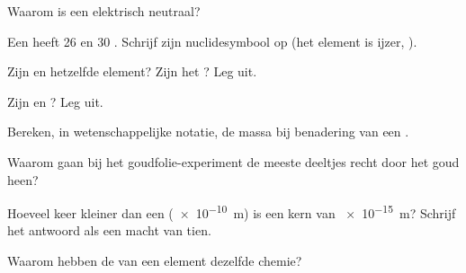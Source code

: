 \begin{exercise}[$\star$]\label{exo:g9:inside-the-atom:3}
Waarom is een  elektrisch neutraal?
\end{exercise}

\begin{exercise}[$\star$]\label{exo:g9:inside-the-atom:4}
Een  heeft 26  en 30 . Schrijf zijn nuclidesymbool
op (het element is ijzer, ).
\end{exercise}

\begin{exercise}[$\star\star$]\label{exo:g9:inside-the-atom:5}
Zijn  en  hetzelfde element? Zijn het
? Leg uit.
\end{exercise}

\begin{exercise}[$\star\star$]\label{exo:g9:inside-the-atom:6}
Zijn  en  ? Leg uit.
\end{exercise}

\begin{exercise}[$\star\star$]\label{exo:g9:inside-the-atom:7}
Bereken, in wetenschappelijke notatie, de massa bij benadering van een
 .
\end{exercise}

\begin{exercise}[$\star\star$]\label{exo:g9:inside-the-atom:8}
Waarom gaan bij het goudfolie-experiment de meeste deeltjes recht door
het goud heen?
\end{exercise}

\begin{exercise}[$\star\star$]\label{exo:g9:inside-the-atom:9}
Hoeveel keer kleiner dan een  (\qty{e-10}{m}) is een kern van
\qty{e-15}{m}? Schrijf het antwoord als een macht van tien.
\end{exercise}

\begin{exercise}[$\star\star$]\label{exo:g9:inside-the-atom:10}
Waarom hebben de  van een element dezelfde chemie?
\end{exercise}

